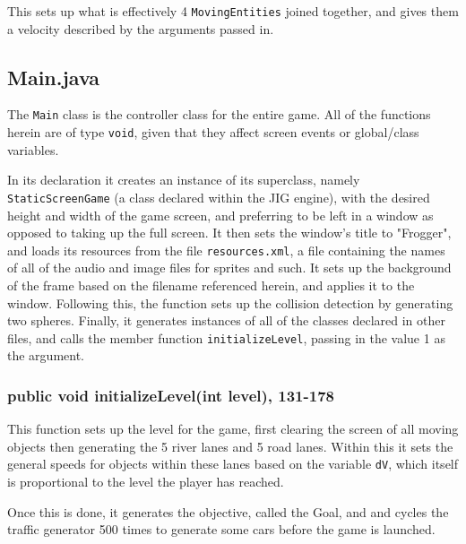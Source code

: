 \documentclass[12pt]{article}
\begin{document}
This sets up what is effectively 4 \verb|MovingEntities| joined together, and gives them a velocity described by the arguments passed in.

\subsection{Main.java}
The \verb|Main| class is the controller class for the entire game.
All of the functions herein are of type \verb|void|, given that they affect screen events or global/class variables.

In its declaration it creates an instance of its superclass, namely \verb|StaticScreenGame| (a class declared within the JIG engine), with the desired height and width of the game screen, and preferring to be left in a window as opposed to taking up the full screen.
It then sets the window's title to "Frogger", and loads its resources from the file \verb|resources.xml|, a file containing the names of all of the audio and image files for sprites and such.
It sets up the background of the frame based on the filename referenced herein, and applies it to the window.
Following this, the function sets up the collision detection by generating two spheres.
Finally, it generates instances of all of the classes declared in other files, and calls the member function \verb|initializeLevel|, passing in the value 1 as the argument.

\subsubsection{public void initializeLevel(int level), 131-178}
This function sets up the level for the game, first clearing the screen of all moving objects then generating the 5 river lanes and 5 road lanes.
Within this it sets the general speeds for objects within these lanes based on the variable \verb|dV|, which itself is proportional to the level the player has reached.

Once this is done, it generates the objective, called the Goal, and and cycles the traffic generator 500 times to generate some cars before the game is launched.
\end{document}
